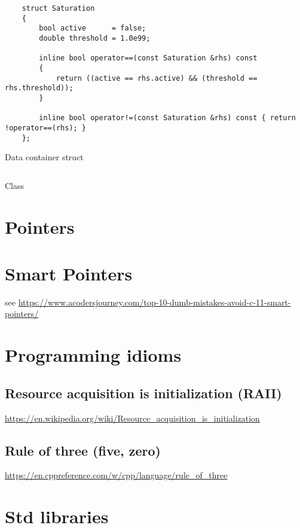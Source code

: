 \documentclass[
10pt,
a4paper,
parskip=half,	%
DIV=0,			%
BCOR=10mm
]{scrartcl}
\begin{document}
\begin{listing}[htbp]
	\begin{verbatim}
	struct Saturation
	{
		bool active      = false;
		double threshold = 1.0e99;
		
		inline bool operator==(const Saturation &rhs) const
		{
			return ((active == rhs.active) && (threshold == rhs.threshold));
		}
		
		inline bool operator!=(const Saturation &rhs) const { return !operator==(rhs); }
	};
	\end{verbatim}
	\caption{Data container struct}
\end{listing}

\begin{listing}[htbp]
	\inputminted{cpp}{src/classes-structs/ReceiverPath.h}
	\caption{Class}
\end{listing}
	
\pagebreak
\section{Pointers}

	
\section{Smart Pointers}
    see \url{https://www.acodersjourney.com/top-10-dumb-mistakes-avoid-c-11-smart-pointers/}	
\section{Programming idioms} 
\label{sec:programming-idioms}
	\subsection{Resource acquisition is initialization (RAII)}
	
	\url{https://en.wikipedia.org/wiki/Resource_acquisition_is_initialization}
	
	\subsection{Rule of three (five, zero)}
	\label{subsec:rule-of-three}
	
	\url{https://en.cppreference.com/w/cpp/language/rule_of_three}
	

\section{Std libraries}
	
\end{document}
